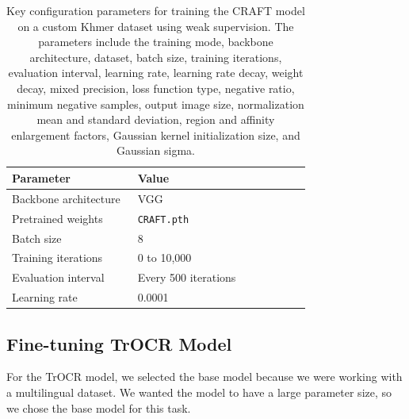 \begin{table}[H]
\centering
\begin{tabular}{|p{0.4\linewidth}|p{0.55\linewidth}|}
\hline
\textbf{Parameter} & \textbf{Value} \\
\hline
Backbone architecture & VGG \\
Pretrained weights & \texttt{CRAFT.pth} \\
Batch size & 8 \\
Training iterations & 0 to 10,000 \\
Evaluation interval & Every 500 iterations \\
Learning rate & 0.0001 \\
\hline
\end{tabular}
\caption{Key configuration parameters for training the CRAFT model on a custom Khmer dataset 
using weak supervision. The parameters include the training mode, backbone architecture, 
dataset, batch size, training iterations, evaluation interval, learning rate, learning rate decay, 
weight decay, mixed precision, loss function type, negative ratio, minimum negative samples, 
output image size, normalization mean and standard deviation, region and affinity enlargement 
factors, Gaussian kernel initialization size, and Gaussian sigma.}
\label{tab:craft-training-config}
\end{table}




\subsection{Fine-tuning TrOCR Model}
\label{subsec:fine-tuning-trocr-model}
For the TrOCR model, we selected the base model because we were working with a multilingual 
dataset. We wanted the model to have a large parameter size, so we chose the base model for 
this task.

